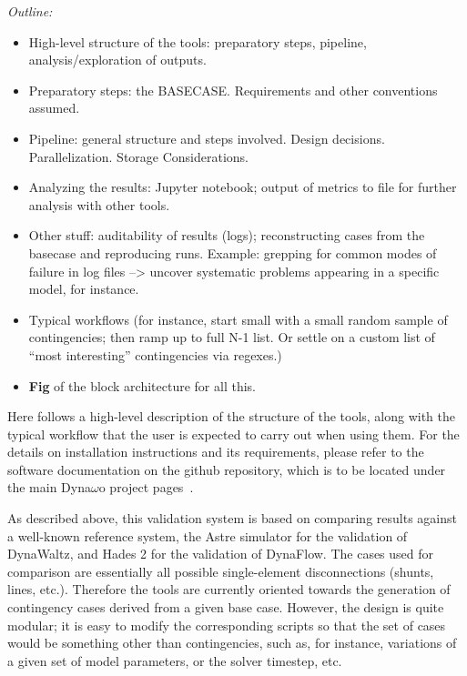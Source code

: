 \documentclass[conference]{IEEEtran}
\begin{document}
\begin{center}
  \itshape
  Outline:
  \begin{itemize}
    \item High-level structure of the tools: preparatory steps, pipeline,
          analysis/exploration of outputs.
    \item Preparatory steps: the BASECASE. Requirements and other conventions
          assumed.
    \item Pipeline: general structure and steps involved. Design
          decisions. Parallelization. Storage Considerations.
    \item Analyzing the results: Jupyter notebook; output of metrics to
          file for further analysis with other tools.
    \item Other stuff: auditability of results (logs); reconstructing
          cases from the basecase and reproducing runs. Example: grepping for
          common modes of failure in log files --> uncover systematic problems
          appearing in a specific model, for instance.
    \item Typical workflows (for instance, start small with a small random
          sample of contingencies; then ramp up to full N-1 list. Or settle on
          a custom list of ``most interesting'' contingencies via regexes.)
    \item \textbf{Fig} of the block architecture for all this.
  \end{itemize}
\end{center}


Here follows a high-level description of the structure of the tools, along with
the typical workflow that the user is expected to carry out when using them.
For the details on installation instructions and its requirements, please refer
to the software documentation on the github repository, which is to be located
under the main Dyna$\omega$o project pages~\cite{DwoGitRepos}.

As described above, this validation system is based on comparing results against
a well-known reference system, the Astre simulator for the validation of DynaWaltz, and Hades 2 for the validation of DynaFlow. The cases used for
comparison are essentially all possible single-element disconnections (shunts,
lines, etc.). Therefore the tools are currently oriented towards the generation of
contingency cases derived from a given base case. However, the design is quite
modular; it is easy to modify the corresponding scripts so that the set of cases
would be something other than contingencies, such as, for instance, variations
of a given set of model parameters, or the solver timestep, etc.
\end{document}
